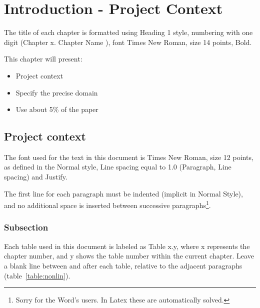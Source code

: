 \documentclass[12pt,a4paper,twoside]{report}
\begin{document}
\thispagestyle{empty}

\newpage




 

\newpage

\tableofcontents
\newpage



\chapter{Introduction - Project Context}
\pagestyle{headings}

The title of each chapter is formatted using Heading 1 style, numbering with one digit (Chapter x. Chapter Name ), font Times New Roman, size 14 points, Bold.

This chapter will present:

\begin{itemize}
 \item Project context 
\item Specify the precise domain
\item Use about 5\% of the paper
\end{itemize}


\section{Project context}

The font used for the text in this document is Times New Roman, size 12 points, as defined in the Normal style, Line spacing equal to 1.0 (Paragraph, Line spacing) and Justify. 

The first line for each paragraph must be indented (implicit in Normal Style), and no additional space is inserted between successive paragraphs\footnote{Sorry for the Word's users. In Latex these are automatically solved.}.


\subsection{Subsection}
Each table used in this document is labeled as Table x.y, where x represents the chapter number, and y shows the table number within the current chapter. Leave a blank line between and after each table, relative to the adjacent paragraphs (table~\ref{table:nonlin}).
\end{document}
